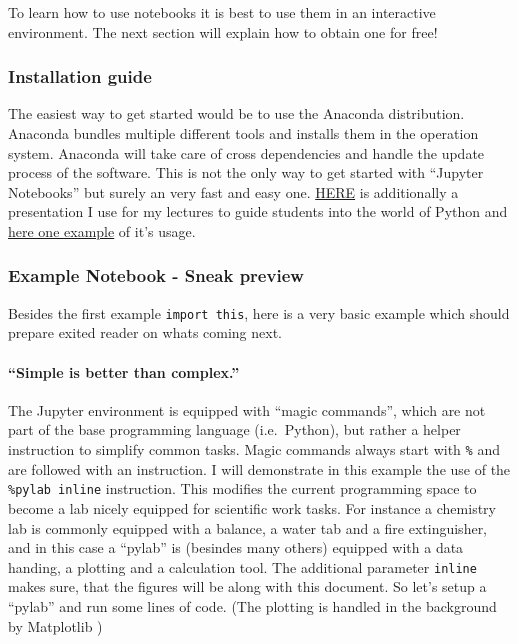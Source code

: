 \documentclass[11pt]{article}
\begin{document}
To learn how to use notebooks it is best to use them in an interactive
environment. The next section will explain how to obtain one for free!

    \hypertarget{installation-guide}{%
\subsubsection{Installation guide}\label{installation-guide}}

The easiest way to get started would be to use the Anaconda
distribution. Anaconda bundles multiple different tools and installs
them in the operation system. Anaconda will take care of cross
dependencies and handle the update process of the software. This is not
the only way to get started with ``Jupyter Notebooks'' but surely an
very fast and easy one.
\href{media/presentations/InstallAnaconda/Anaconda-Python.pdf}{HERE} is
additionally a presentation I use for my lectures to guide students into
the world of Python and
\href{media/presentations/InstallAnaconda/PythonÜbung.zip}{here one
example} of it's usage.

    \hypertarget{example-notebook---sneak-preview}{%
\subsubsection{Example Notebook - Sneak
preview}\label{example-notebook---sneak-preview}}

Besides the first example \texttt{import\ this}, here is a very basic
example which should prepare exited reader on whats coming next.

    \hypertarget{simple-is-better-than-complex.}{%
\paragraph{``Simple is better than
complex.''}\label{simple-is-better-than-complex.}}

The Jupyter environment is equipped with ``magic commands'', which are
not part of the base programming language (i.e.~Python), but rather a
helper instruction to simplify common tasks. Magic commands always start
with \texttt{\%} and are followed with an instruction. I will
demonstrate in this example the use of the \texttt{\%pylab\ inline}
instruction. This modifies the current programming space to become a lab
nicely equipped for scientific work tasks. For instance a chemistry lab
is commonly equipped with a balance, a water tab and a fire
extinguisher, and in this case a ``pylab'' is (besindes many others)
equipped with a data handing, a plotting and a calculation tool. The
additional parameter \texttt{inline} makes sure, that the figures will
be along with this document. So let's setup a ``pylab'' and run some
lines of code. (The plotting is handled in the background by Matplotlib
\cite{Hunter2007})
\end{document}

